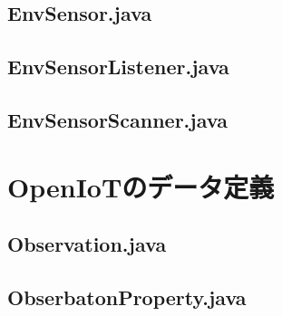 \documentclass{kuisthesis}			%
\begin{document}
\subsection{EnvSensor.java}


\subsection{EnvSensorListener.java}


\subsection{EnvSensorScanner.java}


\section{OpenIoTのデータ定義}
\subsection{Observation.java}


\subsection{ObserbatonProperty.java}

\end{document}
